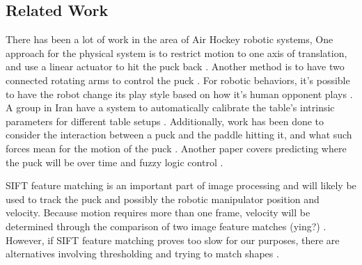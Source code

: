 \documentclass[letterpaper, 10 pt, conference]{ieeeconf}
\begin{document}
\subsection{Related Work}
There has been a  lot of work in the area of Air Hockey robotic systems, One approach for the physical system is to restrict motion to one axis of translation, and use a linear actuator to hit the puck back \cite{marra}. Another method is to have two connected rotating arms to control the puck \cite{bishop}. For robotic behaviors, it’s possible to have the robot change its play style based on how it’s human opponent plays \cite{namiki}. A group in Iran have a system to automatically calibrate the table’s intrinsic parameters for different table setups \cite{alizadeh}. Additionally, work has been done to consider the interaction between a puck and the paddle hitting it, and what such forces mean for the motion of the puck \cite{ghazvini} \cite{iguchi}. Another paper covers predicting where the puck will be over time and fuzzy logic control \cite{wang}.

SIFT feature matching is an important part of image processing and will likely be used to track the puck and possibly the robotic manipulator position and velocity. Because motion requires more than one frame, velocity will be determined through the comparison of two image feature matches (ying?) \cite{rahman}. However, if SIFT feature matching proves too slow for our purposes, there are alternatives involving thresholding and trying to match shapes \cite{wang} \cite{marra} \cite{bishop}.
\end{document}
